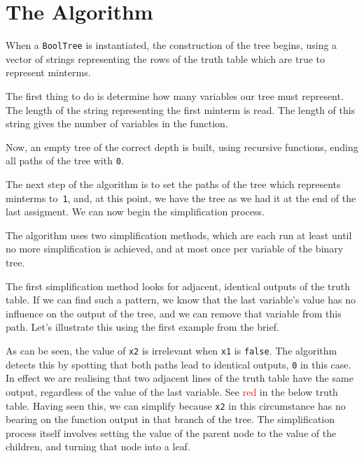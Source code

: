 \documentclass[12pt]{article}
\begin{document}
    \section{The Algorithm}
    
    When a \texttt{BoolTree} is instantiated, the construction of the tree begins, using a vector of strings representing the rows of the truth table which are true to represent minterms.

    The first thing to do is determine how many variables our tree must represent. The length of the string representing the first minterm is read. The length of this string gives the number of variables in the function.
    
    Now, an empty tree of the correct depth is built, using recursive functions, ending all paths of the tree with \texttt{0}.

    The next step of the algorithm is to set the paths of the tree which represents minterms to~\texttt{1}, and, at this point, we have the tree as we had it at the end of the last assigment. We can now begin the simplification process.

    The algorithm uses two simplification methods, which are each run at least until no more simplification is achieved, and at most once per variable of the binary tree.

    The first simplification method looks for adjacent, identical outputs of the truth table. If we can find such a pattern, we know that the last variable's value has no influence on the output of the tree, and we can remove that variable from this path. Let's illustrate this using the first example from the brief.

    \pagebreak

    As can be seen, the value of \texttt{x2} is irrelevant when \texttt{x1} is \texttt{false}. The algorithm detects this by spotting that both paths lead to identical outputs, \texttt{0} in this case.
    In effect we are realising that two adjacent lines of the truth table have the same output, regardless of the value of the last variable. See \textcolor{red}{red} in the below truth table. Having seen this, we can simplify because \texttt{x2} in this circumstance has no bearing on the function output in that branch of the tree. The simplification process itself involves setting the value of the parent node to the value of the children, and turning that node into a leaf.
\end{document}
